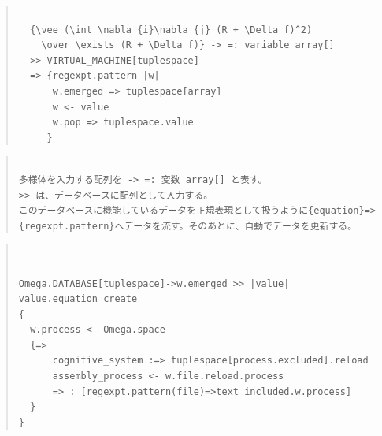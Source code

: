 \documentclass{jsarticle}
\begin{document}
\begin{quote}
\setlength{\baselineskip}{12pt}
\begin{verbatim}

  {\vee (\int \nabla_{i}\nabla_{j} (R + \Delta f)^2) 
    \over \exists (R + \Delta f)} -> =: variable array[]  
  >> VIRTUAL_MACHINE[tuplespace] 
  => {regexpt.pattern |w|
      w.emerged => tuplespace[array]
      w <- value
      w.pop => tuplespace.value
     }
\end{verbatim}
\end{quote}


\begin{quote}
\setlength{\baselineskip}{12pt}
\begin{verbatim}
 
多様体を入力する配列を -> =: 変数 array[] と表す。
>> は、データベースに配列として入力する。
このデータベースに機能しているデータを正規表現として扱うように{equation}=>
{regexpt.pattern}へデータを流す。そのあとに、自動でデータを更新する。
\end{verbatim}
\end{quote}

\begin{quote}
\setlength{\baselineskip}{12pt}
\begin{verbatim}


Omega.DATABASE[tuplespace]->w.emerged >> |value| value.equation_create
{
  w.process <- Omega.space
  {=>
      cognitive_system :=> tuplespace[process.excluded].reload
      assembly_process <- w.file.reload.process
      => : [regexpt.pattern(file)=>text_included.w.process]
  }
}
\end{verbatim}
\end{quote}
\end{document}
